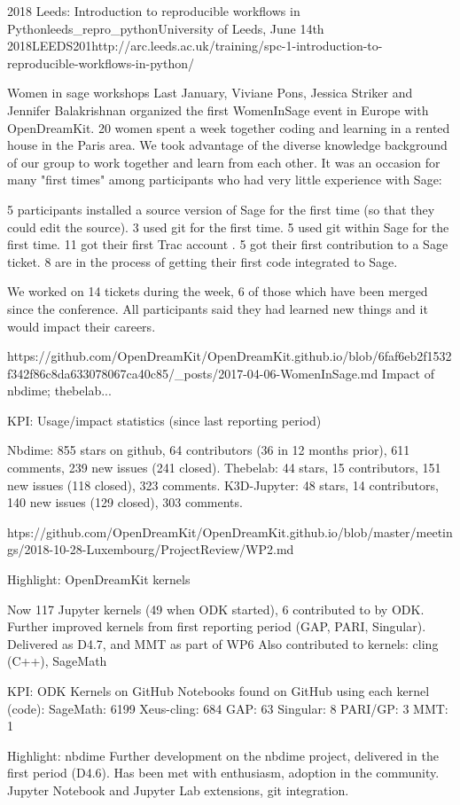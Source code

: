 \begin{Aim 1}
\begin{Aim 2}
\begin{event}{2018 Leeds: Introduction to reproducible workflows in Python}{leeds_repro_python}{University of Leeds, June 14th 2018}{LEEDS}{20}{1}{http://arc.leeds.ac.uk/training/spc-1-introduction-to-reproducible-workflows-in-python/}
\begin{itemize}
 
 Women in sage workshops
 Last January, Viviane Pons, Jessica Striker and Jennifer Balakrishnan organized the first WomenInSage event in Europe with OpenDreamKit. 20 women spent a week together coding and learning in a rented house in the Paris area.
We took advantage of the diverse knowledge background of our group to work together and learn from each other. It was an occasion for many "first times" among participants who had very little experience with Sage:

    5 participants installed a source version of Sage for the first time (so that they could edit the source).
    3 used git for the first time.
    5 used git within Sage for the first time.
    11 got their first Trac account .
    5 got their first contribution to a Sage ticket.
    8 are in the process of getting their first code integrated to Sage.

We worked on 14 tickets during the week, 6 of those which have been merged since the conference. All participants said they had learned new things and it would impact their careers.

https://github.com/OpenDreamKit/OpenDreamKit.github.io/blob/6faf6eb2f1532f342f86c8da633078067ca40c85/_posts/2017-04-06-WomenInSage.md
Impact of nbdime; thebelab...

KPI: Usage/impact statistics (since last reporting period)

Nbdime: 855 stars on github, 64 contributors (36 in 12 months prior), 611 
comments, 239 new issues (241 closed).
Thebelab: 44 stars, 15 contributors, 151 new issues (118 closed), 323 
comments.
K3D-Jupyter: 48 stars, 14 contributors, 140 new issues (129 closed), 303 
comments.

htps://github.com/OpenDreamKit/OpenDreamKit.github.io/blob/master/meetings/2018-10-28-Luxembourg/ProjectReview/WP2.md

Highlight: OpenDreamKit kernels

Now 117 Jupyter kernels (49 when ODK started), 6 contributed to by ODK.
Further improved kernels from first reporting period (GAP, PARI, Singular). 
Delivered as D4.7, and MMT as part of WP6
Also contributed to kernels: cling (C++), SageMath

KPI: ODK Kernels on GitHub
Notebooks found on GitHub using each kernel (code):
SageMath: 6199
Xeus-cling: 684
GAP: 63
Singular: 8
PARI/GP: 3
MMT: 1

Highlight: nbdime
Further development on the nbdime project, delivered in the first period (D4.6). Has been met with enthusiasm, adoption in the community.
Jupyter Notebook and Jupyter Lab extensions, git integration.


\end{itemize}
\end{event}
\end{Aim 2}
\end{Aim 1}

